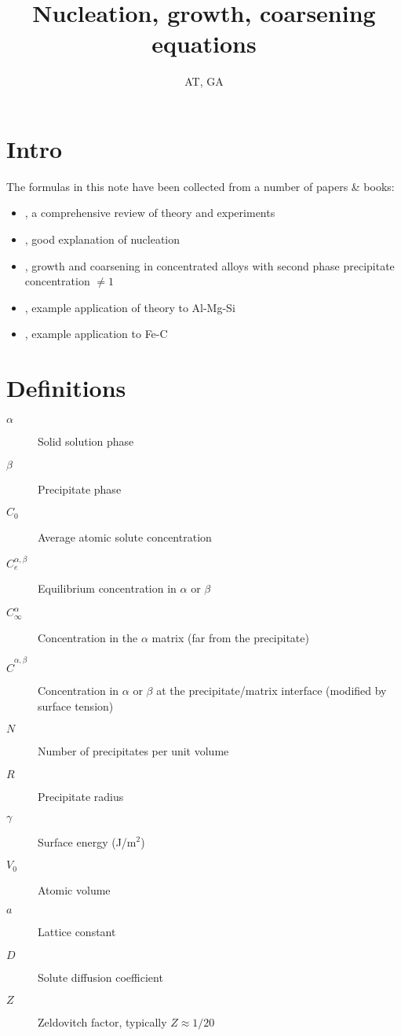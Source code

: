 \documentclass[12pt,a4paper]{article}
\author{AT, GA}
\title{Nucleation, growth, coarsening equations}
\begin{document}
\maketitle

\section{Intro}

The formulas in this note have been collected from a number of papers \& books:
\begin{itemize}
\item \citet{Wagner-2005-HomogeneousSecond-P}, a comprehensive review of theory and experiments
\item \citet{Russell-1980-Nucleationinsolids}, good explanation of nucleation
\item \citet{Calderon-1994-Ostwaldripeningin}, growth and coarsening in concentrated alloys with second phase precipitate concentration $\neq 1$
\item \citet{Deschamps-1998-Influenceofpredefo}, example application of theory to Al-Mg-Si
\item \citet{Perez-2003-ID509}, example application to Fe-C
\end{itemize}



\section{Definitions}

\begin{description}
\item[$\alpha$] Solid solution phase
\item[$\beta$] Precipitate phase
\item[$C_0$] Average atomic solute concentration
\item[$C_e^{\alpha,\beta}$] Equilibrium concentration in $\alpha$ or $\beta$ 
\item[$C_\infty^{\alpha}$] Concentration in the $\alpha$ matrix (far from the precipitate)
\item[$\hat{C}^{\alpha,\beta}$] Concentration in $\alpha$ or $\beta$ at the precipitate/matrix interface (modified by surface tension)
\item[$N$] Number of precipitates per unit volume
\item[$R$] Precipitate radius
\item[$\gamma$] Surface energy (J/m$^2$)
\item[$V_0$] Atomic volume
\item[$a$] Lattice constant
\item[$D$] Solute diffusion coefficient
\item[$Z$] Zeldovitch factor, typically $Z\approx 1/20$
\end{description}
\end{document}
